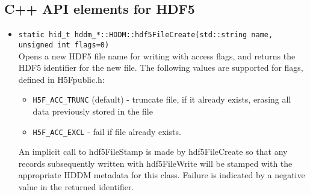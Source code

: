\documentclass{revtex4}
\begin{document}
\subsection{C++ API elements for HDF5}

\begin{itemize}
\item \texttt{static hid\_t hddm\_*::HDDM::hdf5FileCreate(std::string name, unsigned int flags=0)}\\
Opens a new HDF5 file name for writing with access flags, and returns the HDF5
identifier for the new file. The following values are supported for flags, defined
in H5Fpublic.h:
\begin{itemize}
\item \texttt{H5F\_ACC\_TRUNC} (default) - truncate file, if it already exists, 
erasing all data previously stored in the file
\item \texttt{H5F\_ACC\_EXCL} - fail if file already exists.
\end{itemize}
An implicit call to hdf5FileStamp is made by hdf5FileCreate so that any records
subsequently written with hdf5FileWrite will be stamped with the appropriate HDDM
metadata for this class. Failure is indicated by a negative value in the returned
identifier.


\end{itemize}
\end{document}
